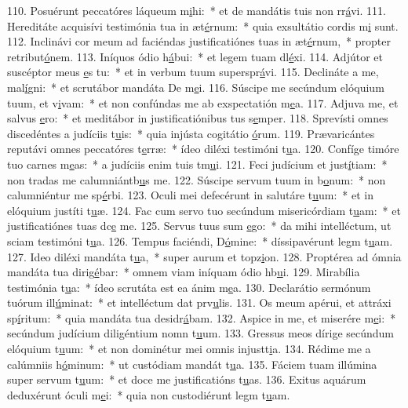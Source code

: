 110. Posuérunt peccatóres láqueum m\uline{i}hi:~* et de mandátis tuis non rr\uline{á}vi.
111. Hereditáte acquisívi testimónia tua in æt\uline{é}rnum:~* quia exsultátio cordis m\uline{i} sunt.
112. Inclinávi cor meum ad faciéndas justificatiónes tuas in æt\uline{é}rnum,~* propter retribut\uline{ó}nem.
113. Iníquos ódio h\uline{á}bui:~* et legem tuam dl\uline{é}xi.
114. Adjútor et suscéptor meus \uline{e}s tu:~* et in verbum tuum superspr\uline{á}vi.
115. Declináte a me, mal\uline{í}gni:~* et scrutábor mandáta De m\uline{e}i.
116. Súscipe me secúndum elóquium tuum, et v\uline{i}vam:~* et non confúndas me ab exspectatión m\uline{e}a.
117. Adjuva me, et salvus \uline{e}ro:~* et meditábor in justificatiónibus tus s\uline{e}mper.
118. Sprevísti omnes discedéntes a judíciis t\uline{u}is:~* quia injústa cogitátio \uline{ó}rum.
119. Prævaricántes reputávi omnes peccatóres t\uline{e}rræ:~* ídeo diléxi testimóni t\uline{u}a.
120. Confíge timóre tuo carnes m\uline{e}as:~* a judíciis enim tuis tm\uline{u}i.
121. Feci judícium et just\uline{í}tiam:~* non tradas me calumniántb\uline{u}s me.
122. Súscipe servum tuum in b\uline{o}num:~* non calumniéntur me sp\uline{é}rbi.
123. Oculi mei defecérunt in salutáre t\uline{u}um:~* et in elóquium justíti t\uline{u}æ.
124. Fac cum servo tuo secúndum misericórdiam t\uline{u}am:~* et justificatiónes tuas dc\uline{e} me.
125. Servus tuus sum \uline{e}go:~* da mihi intelléctum, ut sciam testimóni t\uline{u}a.
126. Tempus faciéndi, D\uline{ó}mine:~* díssipavérunt legm t\uline{u}am.
127. Ideo diléxi mandáta t\uline{u}a,~* super aurum et topz\uline{i}on.
128. Proptérea ad ómnia mandáta tua dirig\uline{é}bar:~* omnem viam iníquam ódio hb\uline{u}i.
129. Mirabília testimónia t\uline{u}a:~* ídeo scrutáta est ea ánim m\uline{e}a.
130. Declarátio sermónum tuórum ill\uline{ú}minat:~* et intelléctum dat prv\uline{u}lis.
131. Os meum apérui, et attráxi sp\uline{í}ritum:~* quia mandáta tua desidr\uline{á}bam.
132. Aspice in me, et miserére m\uline{e}i:~* secúndum judícium diligéntium nomn t\uline{u}um.
133. Gressus meos dírige secúndum elóquium t\uline{u}um:~* et non dominétur mei omnis injustt\uline{i}a.
134. Rédime me a calúmniis h\uline{ó}minum:~* ut custódiam mandát t\uline{u}a.
135. Fáciem tuam illúmina super servum t\uline{u}um:~* et doce me justificatións t\uline{u}as.
136. Exitus aquárum deduxérunt óculi m\uline{e}i:~* quia non custodiérunt legm t\uline{u}am.
